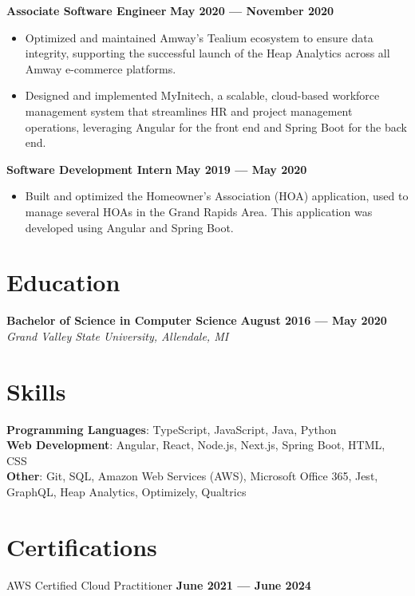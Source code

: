 \documentclass{article}
\begin{document}
\textbf{Associate Software Engineer} \hfill \textbf{May 2020 --- November 2020}
\begin{itemize}
  \item Optimized and maintained Amway’s Tealium ecosystem to ensure data integrity, supporting the successful launch of the Heap Analytics across all Amway e-commerce platforms.
  \item Designed and implemented MyInitech, a scalable, cloud-based workforce management system that streamlines HR and project management operations, leveraging Angular for the front end and Spring Boot for the back end.
\end{itemize}
\medskip

\textbf{Software Development Intern} \hfill \textbf{May 2019 --- May 2020}
\begin{itemize}
  \item Built and optimized the Homeowner's Association (HOA) application, used to manage several HOAs in the Grand Rapids Area. This application was developed using Angular and Spring Boot.
\end{itemize}

\section*{Education}
\textbf{Bachelor of Science in Computer Science} \hfill \textbf{August 2016 --- May 2020}\\
\textit{Grand Valley State University, Allendale, MI}
\section*{Skills}
\textbf{Programming Languages}: TypeScript, JavaScript, Java, Python\\
\textbf{Web Development}: Angular, React, Node.js, Next.js, Spring Boot, HTML, CSS\\
\textbf{Other}: Git, SQL, Amazon Web Services (AWS), Microsoft Office 365, Jest, GraphQL, Heap Analytics, Optimizely, Qualtrics

\section*{Certifications}
AWS Certified Cloud Practitioner \hfill \textbf{June 2021 --- June 2024}
\end{document}
